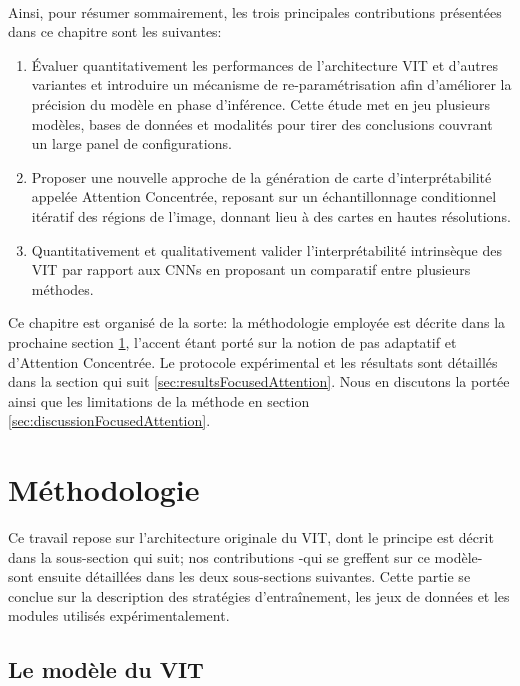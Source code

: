 \\ 
Ainsi, pour résumer sommairement, les trois principales contributions présentées dans ce chapitre sont les suivantes:
\begin{enumerate}
	\item Évaluer quantitativement les performances de l'architecture \ac{VIT} et d'autres variantes et introduire un mécanisme de re-paramétrisation afin d'améliorer la précision du modèle en phase d'inférence. Cette étude met en jeu plusieurs modèles, bases de données et modalités pour tirer des conclusions couvrant un large panel de configurations.
	\item Proposer une nouvelle approche de la génération de carte d'interprétabilité appelée Attention Concentrée, reposant sur un échantillonnage conditionnel itératif des régions de l'image, donnant lieu à des cartes en hautes résolutions.
	\item Quantitativement et qualitativement valider l'interprétabilité intrinsèque des \ac{VIT} par rapport aux \ac{CNN}s en proposant un comparatif entre plusieurs méthodes.
\end{enumerate}

Ce chapitre est organisé de la sorte: la méthodologie employée est décrite dans la prochaine section \ref{sec:methodoFocusedAttention}, l'accent étant porté sur la notion de pas adaptatif et d'Attention Concentrée. Le protocole expérimental et les résultats sont détaillés dans la section qui suit \ref{sec:resultsFocusedAttention}. Nous en discutons la portée ainsi que les limitations de la méthode en section \ref{sec:discussionFocusedAttention}.
\section{Méthodologie}
\label{sec:methodoFocusedAttention}

Ce travail repose sur l'architecture originale du \ac{VIT}, dont le principe est décrit dans la sous-section qui suit; nos contributions -qui se greffent sur ce modèle- sont ensuite détaillées dans les deux sous-sections suivantes. Cette partie se conclue sur la description des stratégies d'entraînement, les jeux de données et les modules utilisés expérimentalement.
\subsection{Le modèle du \acl{VIT}}

